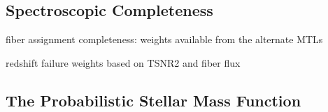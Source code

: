 

\subsection{Spectroscopic Completeness} \label{sec:spec_comp}
fiber assignment completeness: weights available from the alternate MTLs


redshift failure weights based on TSNR2 and fiber flux 

\subsection{The Probabilistic Stellar Mass Function} \label{sec:psmf}

